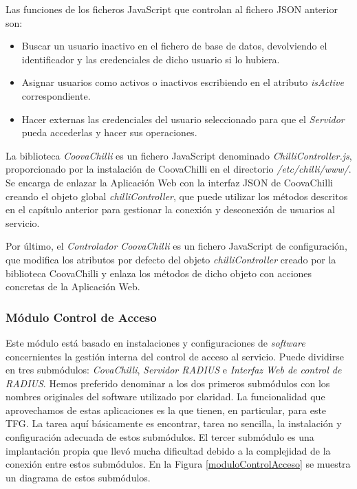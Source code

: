 Las funciones de los ficheros JavaScript que controlan al fichero JSON anterior son:

\begin{itemize}
\item Buscar un usuario inactivo en el fichero de base de datos, devolviendo el identificador y las credenciales de dicho usuario si lo hubiera.
\item Asignar usuarios como activos o inactivos escribiendo en el atributo \emph{isActive} correspondiente.
\item Hacer externas las credenciales del usuario seleccionado para que el \emph{Servidor} pueda accederlas y hacer sus operaciones.
\end{itemize}

La biblioteca \emph{CoovaChilli} es un fichero JavaScript denominado \emph{ChilliController.js}, proporcionado por la instalación de CoovaChilli en el directorio \emph{/etc/chilli/www/}. Se encarga de enlazar la Aplicación Web con la interfaz JSON de CoovaChilli creando el objeto global \emph{chilliController}, que puede utilizar los métodos descritos en el capítulo anterior para gestionar la conexión y desconexión de usuarios al servicio.

Por último, el \emph{Controlador CoovaChilli} es un fichero JavaScript de configuración, que modifica los atributos por defecto del objeto \emph{chilliController} creado por la biblioteca CoovaChilli y enlaza los métodos de dicho objeto con acciones concretas de la Aplicación Web.

\subsubsection{Módulo Control de Acceso}
Este módulo está basado en instalaciones y configuraciones de \emph{software} concernientes la gestión interna del control de acceso al servicio. Puede dividirse en tres submódulos: \emph{CovaChilli}, \emph{Servidor RADIUS} e \emph{Interfaz Web de control de RADIUS}. Hemos preferido denominar a los dos primeros submódulos con los nombres originales del software utilizado por claridad. La funcionalidad que aprovechamos de estas aplicaciones es la que tienen, en particular, para este TFG. La tarea aquí básicamente es encontrar, tarea no sencilla, la instalación y configuración adecuada de estos submódulos. El tercer submódulo es una implantación propia que llevó mucha dificultad debido a la complejidad de la conexión entre estos submódulos. En la Figura \ref{moduloControlAcceso} se muestra un diagrama de estos submódulos.

